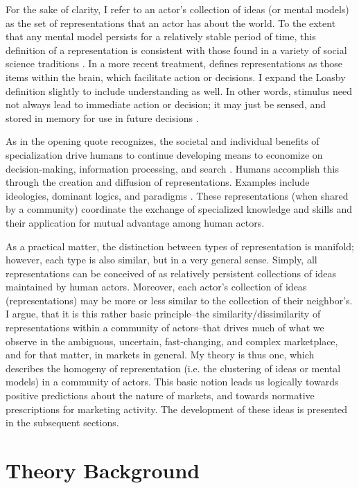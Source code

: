For the sake of clarity, I refer to an actor's collection of ideas (or mental models) as the set of representations that an actor has about the world. To the extent that any mental model persists for a relatively stable period of time, this definition of a representation is consistent with those found in a variety of social science traditions \citep[see e.g.][]{bartlett1932}. In a more recent treatment, \citet{loasby1999} defines representations as those items within the brain, which facilitate action or decisions. I expand the Loasby definition slightly to include understanding as well. In other words, stimulus need not always lead to immediate action or decision; it may just be sensed, and stored in memory for use in future decisions \citep{denzau1994}. 

As \citet{whitehead1911} in the opening quote recognizes, the societal and individual benefits of specialization drive humans to continue developing means to economize on decision-making, information processing, and search \citep{loasby1999}. Humans accomplish this through the creation and diffusion of representations. Examples include ideologies, dominant logics, and paradigms \citep{denzau1994, sperber1985}. These representations (when shared by a community) coordinate the exchange of specialized knowledge and skills and their application for mutual advantage among human actors. 

As a practical matter, the distinction between types of representation is manifold; however, each type is also similar, but in a very general sense. Simply, all representations can be conceived of as relatively persistent collections of ideas maintained by human actors. Moreover, each actor's collection of ideas (representations) may be more or less similar to the collection of their neighbor's. I argue, that it is this rather basic principle--the similarity/dissimilarity of representations within a community of actors--that drives much of what we observe in the ambiguous, uncertain, fast-changing, and complex marketplace, and for that matter, in markets in general. My theory is thus one, which describes the homogeny of representation (i.e. the clustering of ideas or mental models) in a community of actors. This basic notion leads us logically towards positive predictions about the nature of markets, and towards normative prescriptions for marketing activity. The development of these ideas is presented in the subsequent sections.

\section{Theory Background}

